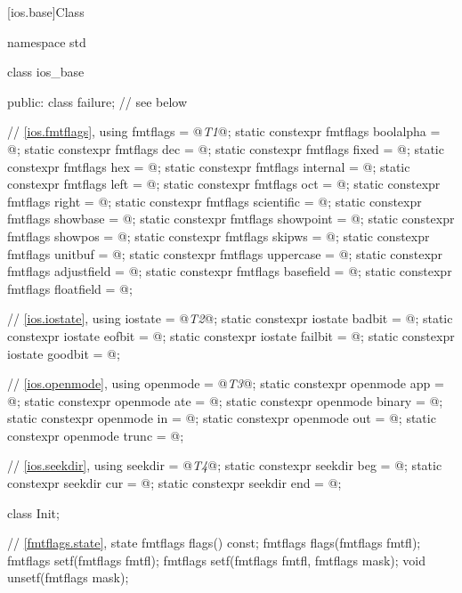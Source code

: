 [ios.base]{Class }
\begin{indexed}{}
\begin{codeblock}
namespace std {
  class ios_base {
  public:
    class failure;              // see below

    // \ref{ios.fmtflags}, 
    using fmtflags = @\textit{T1}@;
    static constexpr fmtflags boolalpha = @\unspec@;
    static constexpr fmtflags dec = @\unspec@;
    static constexpr fmtflags fixed = @\unspec@;
    static constexpr fmtflags hex = @\unspec@;
    static constexpr fmtflags internal = @\unspec@;
    static constexpr fmtflags left = @\unspec@;
    static constexpr fmtflags oct = @\unspec@;
    static constexpr fmtflags right = @\unspec@;
    static constexpr fmtflags scientific = @\unspec@;
    static constexpr fmtflags showbase = @\unspec@;
    static constexpr fmtflags showpoint = @\unspec@;
    static constexpr fmtflags showpos = @\unspec@;
    static constexpr fmtflags skipws = @\unspec@;
    static constexpr fmtflags unitbuf = @\unspec@;
    static constexpr fmtflags uppercase = @\unspec@;
    static constexpr fmtflags adjustfield = @\seebelow@;
    static constexpr fmtflags basefield = @\seebelow@;
    static constexpr fmtflags floatfield = @\seebelow@;

    // \ref{ios.iostate}, 
    using iostate = @\textit{T2}@;
    static constexpr iostate badbit = @\unspec@;
    static constexpr iostate eofbit = @\unspec@;
    static constexpr iostate failbit = @\unspec@;
    static constexpr iostate goodbit = @\seebelow@;

    // \ref{ios.openmode}, 
    using openmode = @\textit{T3}@;
    static constexpr openmode app = @\unspec@;
    static constexpr openmode ate = @\unspec@;
    static constexpr openmode binary = @\unspec@;
    static constexpr openmode in = @\unspec@;
    static constexpr openmode out = @\unspec@;
    static constexpr openmode trunc = @\unspec@;

    // \ref{ios.seekdir}, 
    using seekdir = @\textit{T4}@;
    static constexpr seekdir beg = @\unspec@;
    static constexpr seekdir cur = @\unspec@;
    static constexpr seekdir end = @\unspec@;

    class Init;

    // \ref{fmtflags.state},  state
    fmtflags flags() const;
    fmtflags flags(fmtflags fmtfl);
    fmtflags setf(fmtflags fmtfl);
    fmtflags setf(fmtflags fmtfl, fmtflags mask);
    void unsetf(fmtflags mask);

}}
\end{codeblock}
\end{indexed}
